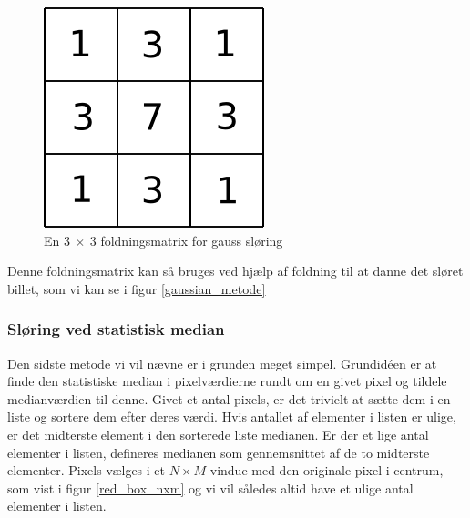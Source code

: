{\begin{figure}[h]
	\begin{center}
		\includegraphics[scale=0.5,angle=0]{afsnit/vores_implementation/billeder/sloering/gauss}
	\end{center}
	\caption[]{En $3~\times{}~3$ foldningsmatrix for gauss sløring}
	\label{gauss}
\end{figure}

Denne foldningsmatrix kan så bruges ved hjælp af foldning til at danne det sløret
billet, som vi kan se i figur \ref{gaussian_metode}

\subsubsection*{Sløring ved statistisk median}
Den sidste metode vi vil nævne er i grunden meget simpel. Grundidéen er
at finde den statistiske median i pixelværdierne rundt om en givet pixel
og tildele medianværdien til denne. Givet et antal pixels, er det
trivielt at sætte dem i en liste og sortere dem efter deres værdi. Hvis
antallet af elementer i listen er ulige, er det midterste element i den
sorterede liste medianen. Er der et lige antal elementer i listen,
defineres medianen som gennemsnittet af de to midterste elementer.
Pixels vælges i et $N \times M$ vindue med den originale pixel i
centrum, som vist i figur \ref{red_box_nxm} og vi vil således altid have
et ulige antal elementer i listen.

}
